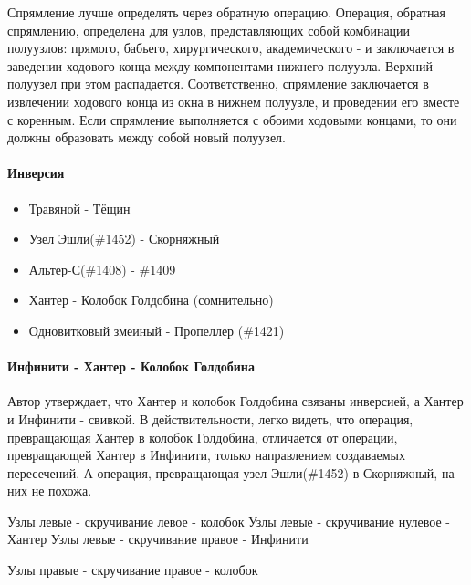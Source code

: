 Спрямление лучше определять через обратную операцию. Операция, обратная спрямлению, определена для узлов, представляющих собой комбинации полуузлов: прямого, бабьего, хирургического, академического - и заключается в заведении ходового конца между компонентами нижнего полуузла. Верхний полуузел при этом распадается.
Соответственно, спрямление заключается в извлечении ходового конца из окна в нижнем полуузле, и проведении его вместе с коренным. Если спрямление выполняется с обоими ходовыми концами, то они должны образовать между собой новый полуузел.

\paragraph{Инверсия}
\begin{itemize}
\item Травяной - Тёщин
\item Узел Эшли(\#1452) - Скорняжный 
\item Альтер-С(\#1408) - \#1409
\item Хантер - Колобок Голдобина (сомнительно)
\item Одновитковый змеиный - Пропеллер (\#1421)
\end{itemize}


\paragraph{Инфинити - Хантер - Колобок Голдобина}
Автор утверждает, что Хантер и колобок Голдобина связаны инверсией, а Хантер и Инфинити - свивкой.
В действительности, легко видеть, что операция, превращающая Хантер в колобок Голдобина, отличается от операции, превращающей Хантер в Инфинити, только направлением создаваемых пересечений. А операция, превращающая узел Эшли(\#1452) в Скорняжный, на них не похожа.

Узлы левые - скручивание левое - колобок
Узлы левые - скручивание нулевое - Хантер
Узлы левые - скручивание правое - Инфинити

Узлы правые - скручивание правое - колобок




